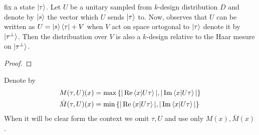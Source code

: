 \documentclass[manuscript,screen,review]{acmart}
\begin{document}
\begin{claim}
  fix a state $\ket{\tau}$. Let $U$ be a unitary sampled from $k$-design  distribution $D$ and denote by $\ket{s}$ the vector which $U$ sends $\ket{\tau}$ to. Now, observes that $U$ can be written as $U = \ket{s}\bra{\tau} + V$ when $V$ act on space ortogonal to $ \ket{\tau}$ denote it by $\ket{\tau^{\perp}}$. Then the distribuation over $V$ is also a $k$-design relative to the Haar mesure on $\ket{\tau^{\perp}}$. 
\end{claim}
\begin{proof}  
\end{proof}

\begin{definition}
  Denote by 
  \begin{equation*}
    \begin{split}
  M(\tau,U)(x) & = \max \left\{ |\operatorname{Re} \braket{x|U\tau}|, |\operatorname{Im} \braket{x|U\tau}| \right\} \\
  \bar{M}(\tau,U)(x) & = \min \left\{ |\operatorname{Re} \braket{x|U\tau}|, |\operatorname{Im} \braket{x|U\tau}| \right\} 
    \end{split}
  \end{equation*}
  When it will be clear form the context we omit $\tau,U$ and use only $M(x), \bar{M}(x)$.
\end{definition}
\end{document}
